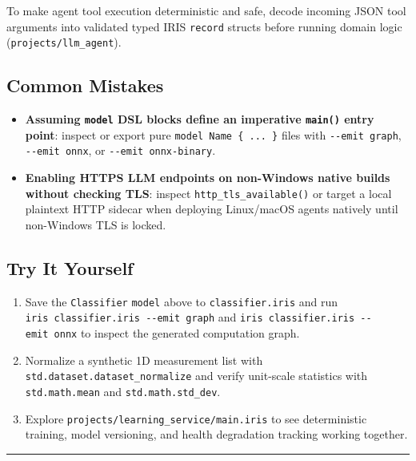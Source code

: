 \documentclass[
  english,
  oneside]{book}
\providecommand{\tightlist}{%
  \setlength{\itemsep}{0pt}\setlength{\parskip}{0pt}}
\begin{document}
To make agent tool execution deterministic and safe, decode incoming
JSON tool arguments into validated typed IRIS \texttt{record} structs
before running domain logic (\texttt{projects/llm\_agent}).

\subsection{Common Mistakes}\label{common-mistakes-13}

\begin{itemize}
\tightlist
\item
  \textbf{Assuming \texttt{model} DSL blocks define an imperative
  \texttt{main()} entry point}: inspect or export pure
  \texttt{model\ Name\ \{\ ...\ \}} files with \texttt{-\/-emit\ graph},
  \texttt{-\/-emit\ onnx}, or \texttt{-\/-emit\ onnx-binary}.
\item
  \textbf{Enabling HTTPS LLM endpoints on non-Windows native builds
  without checking TLS}: inspect \texttt{http\_tls\_available()} or
  target a local plaintext HTTP sidecar when deploying Linux/macOS
  agents natively until non-Windows TLS is locked.
\end{itemize}

\subsection{Try It Yourself}\label{try-it-yourself-13}

\begin{enumerate}
\def\labelenumi{\arabic{enumi}.}
\tightlist
\item
  Save the \texttt{Classifier} \texttt{model} above to
  \texttt{classifier.iris} and run
  \texttt{iris\ classifier.iris\ -\/-emit\ graph} and
  \texttt{iris\ classifier.iris\ -\/-emit\ onnx} to inspect the
  generated computation graph.
\item
  Normalize a synthetic 1D measurement list with
  \texttt{std.dataset.dataset\_normalize} and verify unit-scale
  statistics with \texttt{std.math.mean} and \texttt{std.math.std\_dev}.
\item
  Explore \texttt{projects/learning\_service/main.iris} to see
  deterministic training, model versioning, and health degradation
  tracking working together.
\end{enumerate}

\begin{center}\rule{0.5\linewidth}{0.5pt}\end{center}
\end{document}
